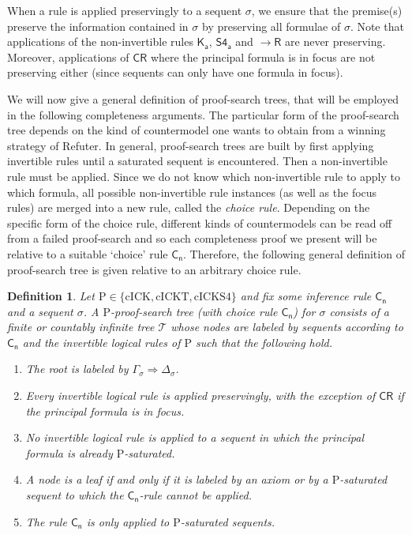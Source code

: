 \documentclass{myifcolog}
\newcommand\C {C}
\newcommand{\K}{K}
\newcommand{\agi}{a}
\newcommand{\hickp}{\mathrm{P}}
\newcommand{\cick}{\mathrm{cICK}}
\newcommand{\cickt}{\mathrm{cICKT}}
\newcommand{\cicks}{\mathrm{cICKS4}}
\newtheorem{definition}[theorem]{Definition}
\numberwithin{theorem}{section}
\begin{document}
When a rule is applied preservingly to a sequent $\sigma$, we ensure that the premise(s) preserve the information contained in $\sigma$ by preserving all formulae of $\sigma$. Note that applications of the non-invertible rules $\mathsf{\K_\agi}$, $\mathsf{S4_\agi}$ and ${\to}{\mathsf{R}}$ are never preserving. Moreover, applications of $\mathsf{\C \mathsf{R}}$ where the principal formula is in focus are not preserving either (since sequents can only have one formula in focus).

We will now give a general definition of proof-search trees, that will be employed in the following completeness arguments. The particular form of the proof-search tree depends on the kind of countermodel one wants to obtain from a winning strategy of Refuter. In general, proof-search trees are built by first applying invertible rules until a saturated sequent is encountered. Then a non-invertible rule must be applied. Since we do not know which non-invertible rule to apply to which formula, all possible non-invertible rule instances (as well as the focus rules) are merged into a new rule, called the \emph{choice rule}. Depending on the specific form of the choice rule, different kinds of countermodels can be read off from a failed proof-search and so each completeness proof we present will be relative to a suitable `choice' rule $\mathsf{C_n}$. Therefore, the following general definition of proof-search tree is given relative to an arbitrary choice rule.

\begin{definition}\label{d: proof-search tree nIM}
    Let $\hickp \in \{\cick, \cickt, \cicks\}$ and fix some inference rule $\mathsf{C_n}$ and a sequent $\sigma$. A \emph{$\hickp$-proof-search tree (with choice rule $\mathsf{C_n}$)} for $\sigma$ consists of a finite or countably infinite tree $\mathcal{T}$ whose nodes are labeled by sequents according to $\mathsf{C_n}$  and the invertible logical rules of $\hickp$ such that the following hold.
    \begin{enumerate}
        \item The root is labeled by $\Gamma_\sigma\Rightarrow \Delta_\sigma$.
        \item Every invertible logical rule is applied preservingly, with the exception of $\mathsf{\C \mathsf{R}}$ if the principal formula is in focus.
        \item No invertible logical rule is applied to a sequent in which the principal formula is already $\hickp$-saturated.
         \item A node is a leaf if and only if it is labeled by an axiom or by a $\hickp$-saturated sequent to which the $\mathsf{C_n}$-rule cannot be applied.
         \item The rule $\mathsf{C_n}$ is only applied to $\hickp$-saturated sequents.
    \end{enumerate}
\end{definition}
\end{document}
